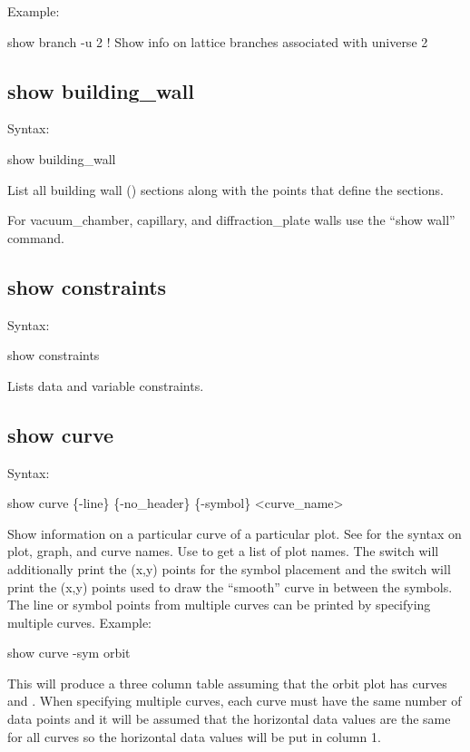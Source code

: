 {{{{{Example:
\begin{example}
  show branch -u 2     ! Show info on lattice branches associated with universe 2
\end{example}


\subsection{show building_wall}
\label{s:show.building}

Syntax:
\begin{example}
  show building_wall
\end{example}
 

List all building wall () sections along with the points that define
the sections.

For vacuum_chamber, capillary, and diffraction_plate walls use the ``show wall'' command.


\subsection{show constraints}
\label{s:show.constraints}

Syntax:
\begin{example}
  show constraints
\end{example}


Lists data and variable constraints.


\subsection{show curve}
\label{s:show.curve}

Syntax:
\begin{example}
  show curve \{-line\} \{-no_header\} \{-symbol\} <curve_name>
\end{example}


Show information on a particular curve of a particular plot. See  for the
syntax on plot, graph, and curve names.  Use  to get a list of plot
names. The  switch will additionally print the (x,y) points for the symbol
placement and the  switch will print the (x,y) points used to draw the
``smooth'' curve in between the symbols. The line or symbol points from multiple curves
can be printed by specifying multiple curves. Example:
\begin{example}
  show curve -sym orbit
\end{example}
This will produce a three column table assuming that the orbit plot has curves
 and . When specifying multiple curves, each curve must have
the same number of data points and it will be assumed that the horizontal data values are
the same for all curves so the horizontal data values will be put in column 1.

}}}}}
